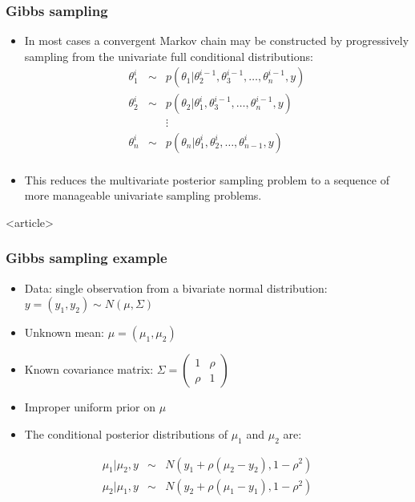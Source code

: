\documentclass{beamer}
\begin{document}
\begin{frame}
  \frametitle{Gibbs sampling}
  
\begin{itemize}
\item In most cases a convergent Markov chain may be constructed by progressively sampling from the univariate full conditional distributions:
\begin{eqnarray*}
\theta_1^i &\sim& p\left(\theta_1|\theta_2^{i-1},\theta_3^{i-1},\ldots,\theta_n^{i-1},y\right) \\
\theta_2^i &\sim& p\left(\theta_2|\theta_1^i,\theta_3^{i-1},\ldots,\theta_n^{i-1},y\right) \\
& & \vdots \\
\theta_n^i &\sim& p\left(\theta_n|\theta_1^i,\theta_2^i,\ldots,\theta_{n-1}^i,y\right) \\
\end{eqnarray*}
\item This reduces the multivariate posterior sampling problem to a sequence of more manageable univariate sampling problems.
\end{itemize}


\end{frame}

\begin{frame}<article>
  \frametitle{Gibbs sampling example}

\begin{itemize}
\item Data: single observation from a bivariate normal distribution: $y = \left(y_1, y_2\right) \sim N\left(\mu, \Sigma\right)$
\item Unknown mean: $\mu = \left(\mu_1, \mu_2\right)$
\item Known covariance matrix: $\Sigma = \left(\begin{array}{cc} 1 & \rho \\ \rho & 1 \end{array}\right)$
\item Improper uniform prior on $\mu$
\item The conditional posterior distributions of $\mu_1$ and $\mu_2$ are:
\end{itemize}
\begin{eqnarray*}
\mu_1|\mu_2,y &\sim& N\left(y_1+\rho\left(\mu_2-y_2\right),1-\rho^2\right) \\
\mu_2|\mu_1,y &\sim& N\left(y_2+\rho\left(\mu_1-y_1\right),1-\rho^2\right) 
\end{eqnarray*}

\end{frame}
\end{document}
